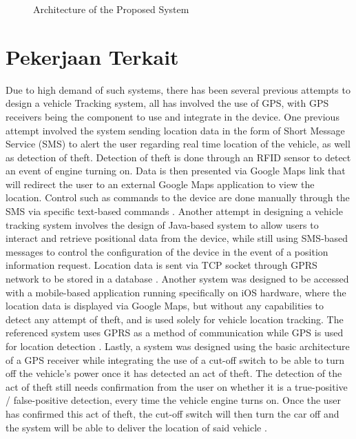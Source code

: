 \documentclass[conference]{IEEEtran}
\begin{document}
\begin{figure}[ht!]
    \centering
    \def\svgwidth{\columnwidth}
    \scalebox{1.8}{}
    \caption{Architecture of the Proposed System}
    \label{fig1}
\end{figure}

\section{Pekerjaan Terkait}
Due to high demand of such systems, there has been several previous attempts to design a vehicle Tracking system, all has involved the use of GPS, with GPS receivers being the component to use and integrate in the device. One previous attempt involved the system sending location data in the form of Short Message Service (SMS) to alert the user regarding real time location of the vehicle, as well as detection of theft. Detection of theft is done through an RFID sensor to detect an event of engine turning on. Data is then presented via Google Maps link that will redirect the user to an external Google Maps application to view the location. Control such as commands to the device are done manually through the SMS via specific text-based commands \cite{iotmounika}. Another attempt in designing a vehicle tracking system involves the design of Java-based system to allow users to interact and retrieve positional data from the device, while still using SMS-based messages to control the 
configuration of the device in the event of a position information request. Location data is sent via TCP socket through GPRS network to be stored in a database \cite{6132526}. Another system was designed to be accessed with a mobile-based application running specifically on iOS hardware, where the location data is displayed via Google Maps, but without any capabilities to detect any attempt of theft, and is used solely for vehicle location tracking. The referenced system uses GPRS as a method of communication while GPS is used for location detection \cite{6803187}.
Lastly, a system was designed using the basic architecture of a GPS receiver while integrating the use of a cut-off switch to be able to turn off the vehicle's power once it has detected an act of theft. The detection of the act of theft still needs confirmation from the user on whether it is a true-positive / false-positive detection, every time the vehicle engine turns on. Once the user has confirmed this act of theft, the cut-off switch will then turn the car off and the system will be able to deliver the location of said vehicle \cite{article1}. 
\end{document}
